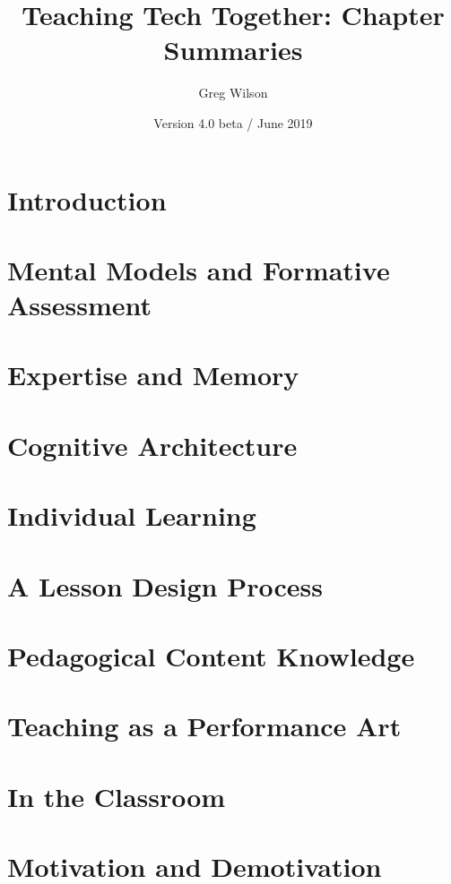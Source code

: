 \documentclass[nemilov1]{Nemilov}
\begin{document}
\title{Teaching Tech Together: Chapter Summaries}
\author{Greg Wilson}
\date{Version 4.0 beta / June 2019}
\maketitle

\mainmatter

\section{Introduction}

\section{Mental Models and Formative Assessment}

\section{Expertise and Memory}

\section{Cognitive Architecture}

\section{Individual Learning}

\section{A Lesson Design Process}

\section{Pedagogical Content Knowledge}

\section{Teaching as a Performance Art}

\section{In the Classroom}

\section{Motivation and Demotivation}
\end{document}
